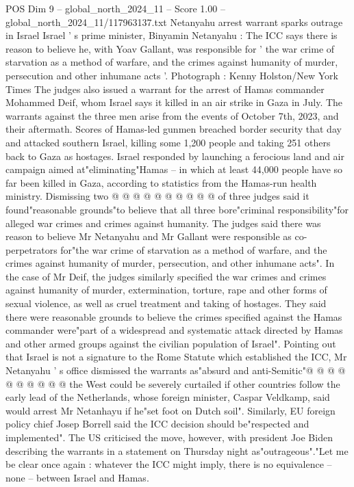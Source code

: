 \begin{textsample}{POS Dim 9 – global\_north\_2024\_11 – Score 1.00 – global\_north\_2024\_11/117963137.txt}  \label{ex:f9_pos_410}
Netanyahu arrest warrant sparks outrage in Israel Israel ' s prime minister, Binyamin Netanyahu : The ICC says there is reason to believe he, with Yoav Gallant, was responsible for ' the war crime of starvation as a method of warfare, and the crimes against humanity of murder, persecution and other inhumane acts '.
Photograph : Kenny Holston/New York Times The judges also issued a warrant for the arrest of Hamas commander Mohammed Deif, whom Israel says it killed in an air strike in Gaza in July.
The warrants against the three men arise from the events of October 7th, 2023, and their aftermath.
Scores of Hamas-led gunmen breached border security that day and attacked southern Israel, killing some 1,200 people and taking 251 others back to Gaza as hostages.
Israel responded by launching a ferocious land and air campaign aimed at"eliminating"Hamas -- in which at least 44,000 people have so far been killed in Gaza, according to statistics from the Hamas-run health ministry.
Dismissing two @ @ @ @ @ @ @ @ @ @ of three judges said it found"reasonable grounds"to believe that all three bore"criminal responsibility"for alleged war crimes and crimes against humanity.
The judges said there was reason to believe Mr Netanyahu and Mr Gallant were responsible as co-perpetrators for"the war crime of starvation as a method of warfare, and the crimes against humanity of murder, persecution, and other inhumane acts".
In the case of Mr Deif, the judges similarly specified the war crimes and crimes against humanity of murder, extermination, torture, rape and other forms of sexual violence, as well as cruel treatment and taking of hostages.
They said there were reasonable grounds to believe the crimes specified against the Hamas commander were"part of a widespread and systematic attack directed by Hamas and other armed groups against the civilian population of Israel".
Pointing out that Israel is not a signature to the Rome Statute which established the ICC, Mr Netanyahu ' s office dismissed the warrants as"absurd and anti-Semitic"@ @ @ @ @ @ @ @ @ @ the West could be severely curtailed if other countries follow the early lead of the Netherlands, whose foreign minister, Caspar Veldkamp, said would arrest Mr Netanhayu if he"set foot on Dutch soil".
Similarly, EU foreign policy chief Josep Borrell said the ICC decision should be"respected and implemented".
The US criticised the move, however, with president Joe Biden describing the warrants in a statement on Thursday night as"outrageous"."Let me be clear once again : whatever the ICC might imply, there is no equivalence -- none -- between Israel and Hamas.

\end{textsample}

